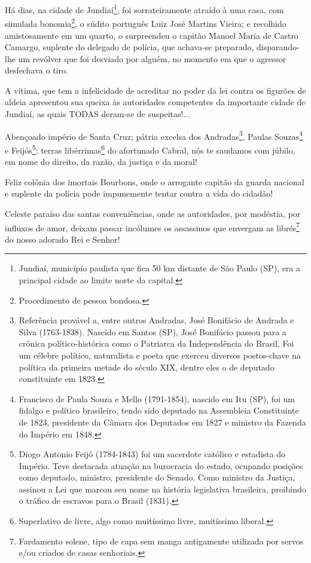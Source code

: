 \asterisc{}

Há dias, na cidade de Jundiaí\footnote{Jundiaí, município paulista que
  fica 50 km distante de São Paulo (SP), era a principal cidade ao
  limite norte da capital.}, foi sorrateiramente atraído à uma casa, com
simulada bonomia\footnote{Procedimento de pessoa bondosa.}, o súdito
português Luiz José Martins Vieira; e recolhido amistosamente em um
quarto, o surpreendeu o capitão Manoel Maria de Castro Camargo, suplente
do delegado de polícia, que achava-se preparado, disparando-lhe um
revólver que foi desviado por alguém, no momento em que o agressor
desfechava o tiro.

A vítima, que tem a infelicidade de acreditar no poder da lei contra os
figurões de aldeia apresentou sua queixa às autoridades competentes da
importante cidade de Jundiaí, as quais TODAS deram-se de suspeitas!...

Abençoado império de Santa Cruz; pátria excelsa dos Andradas\footnote{
  Referência provável a, entre outros Andradas, José Bonifácio de
  Andrada e Silva (1763-1838). Nascido em Santos (SP), José Bonifácio
  passou para a crônica político-histórica como o Patriarca da
  Independência do Brasil. Foi um célebre político, naturalista e poeta
  que exerceu diversos postos-chave na política da primeira metade do
  século XIX, dentre eles o de deputado constituinte em 1823.}, Paulas
Souzas\footnote{Francisco de Paula Souza e Mello (1791-1854), nascido
  em Itu (SP), foi um fidalgo e político brasileiro, tendo sido deputado
  na Assembleia Constituinte de 1823, presidente da Câmara dos Deputados
  em 1827 e ministro da Fazenda do Império em 1848.} e
Feijós\footnote{Diogo Antonio Feijó (1784-1843) foi um sacerdote
  católico e estadista do Império. Teve destacada atuação na burocracia
  do estado, ocupando posições como deputado, ministro, presidente do
  Senado. Como ministro da Justiça, assinou a Lei que marcou seu nome na
  história legislativa brasileira, proibindo o tráfico de escravos para
  o Brasil (1831).}; terras libérrimas\footnote{Superlativo de livre,
  algo como muitíssimo livre, muitíssimo liberal.} do afortunado Cabral,
nós te saudamos com júbilo, em nome do direito, da razão, da justiça e
da moral!

Feliz colônia dos imortais Bourbons, onde o arrogante capitão da guarda
nacional e suplente da polícia pode impunemente tentar contra a vida do
cidadão!

Celeste paraíso das santas conveniências, onde as autoridades, por
modéstia, por influxos de amor, deixam passar incólumes os assassinos
que envergam as librés\footnote{Fardamento solene, tipo de capa sem
  manga antigamente utilizada por servos e/ou criados de casas
  senhoriais.} do nosso adorado Rei e Senhor!

